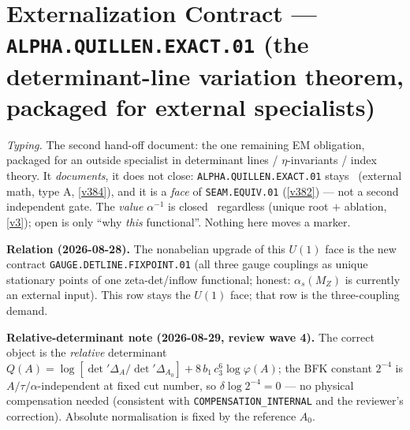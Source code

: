 \documentclass[11pt,a4paper]{article}
\begin{document}
\section*{Externalization Contract --- \texttt{ALPHA.QUILLEN.EXACT.01} (the determinant-line variation theorem, packaged for external specialists)}
\noindent\emph{Typing.} The second hand-off document: the one remaining EM obligation, packaged
for an outside specialist in determinant lines / $\eta$-invariants / index theory. It
\emph{documents}, it does not close: \texttt{ALPHA.QUILLEN.EXACT.01} stays \mO\ (external math,
type A, \vref{v384}), and it is a \emph{face} of \texttt{SEAM.EQUIV.01} (\vref{v382}) --- not a
second independent gate. The \emph{value} $\alpha^{-1}$ is closed \mE\ regardless (unique root
$+$ ablation, \vref{v3}); open is only ``why \emph{this} functional''. Nothing here moves a
marker.

\par\smallskip\noindent\textbf{Relation (2026-08-28).}  The nonabelian upgrade of this $U(1)$
face is the new contract \texttt{GAUGE.DETLINE.FIXPOINT.01} (all three gauge couplings as unique
stationary points of one zeta-det/inflow functional; honest: $\alpha_s(M_Z)$ is currently an
external input).  This row stays the $U(1)$ face; that row is the three-coupling demand.

\par\smallskip\noindent\textbf{Relative-determinant note (2026-08-29, review wave 4).}
The correct object is the \emph{relative} determinant
$Q(A)=\log[\det'\Delta_A/\det'\Delta_{A_0}]+8\,b_1\,c_3^6\log\varphi(A)$;
the BFK constant $2^{-4}$ is $A/\tau/\alpha$-independent at fixed cut number, so
$\delta\log 2^{-4}=0$ --- no physical compensation needed (consistent with
\texttt{COMPENSATION\_INTERNAL} and the reviewer's correction).  Absolute normalisation is
fixed by the reference $A_0$.
\end{document}

